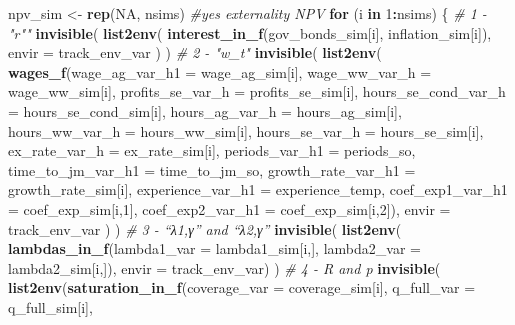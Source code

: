 \documentclass[]{article}
\newenvironment{Shaded}{\begin{snugshade}}{\end{snugshade}}
\newcommand{\CommentTok}[1]{\textcolor[rgb]{0.56,0.35,0.01}{\textit{#1}}}
\newcommand{\ControlFlowTok}[1]{\textcolor[rgb]{0.13,0.29,0.53}{\textbf{#1}}}
\newcommand{\DataTypeTok}[1]{\textcolor[rgb]{0.13,0.29,0.53}{#1}}
\newcommand{\DecValTok}[1]{\textcolor[rgb]{0.00,0.00,0.81}{#1}}
\newcommand{\KeywordTok}[1]{\textcolor[rgb]{0.13,0.29,0.53}{\textbf{#1}}}
\newcommand{\NormalTok}[1]{#1}
\newcommand{\OperatorTok}[1]{\textcolor[rgb]{0.81,0.36,0.00}{\textbf{#1}}}
\newcommand{\OtherTok}[1]{\textcolor[rgb]{0.56,0.35,0.01}{#1}}
\newcommand{\StringTok}[1]{\textcolor[rgb]{0.31,0.60,0.02}{#1}}
\begin{document}
\begin{Shaded}
\begin{Highlighting}[]
\NormalTok{      npv_sim <-}\StringTok{ }\KeywordTok{rep}\NormalTok{(}\OtherTok{NA}\NormalTok{, nsims)}
      \CommentTok{#yes externality NPV}
      \ControlFlowTok{for}\NormalTok{ (i }\ControlFlowTok{in} \DecValTok{1}\OperatorTok{:}\NormalTok{nsims) \{}
          \CommentTok{# 1 - "r""}
          \KeywordTok{invisible}\NormalTok{( }\KeywordTok{list2env}\NormalTok{( }\KeywordTok{interest_in_f}\NormalTok{(gov_bonds_sim[i], inflation_sim[i]), }\DataTypeTok{envir =}\NormalTok{ track_env_var ) )}
          \CommentTok{# 2 - "w_t"}
          \KeywordTok{invisible}\NormalTok{( }\KeywordTok{list2env}\NormalTok{( }\KeywordTok{wages_f}\NormalTok{(}\DataTypeTok{wage_ag_var_h1 =}\NormalTok{ wage_ag_sim[i],}
                                 \DataTypeTok{wage_ww_var_h =}\NormalTok{ wage_ww_sim[i],}
                                 \DataTypeTok{profits_se_var_h =}\NormalTok{ profits_se_sim[i],}
                                 \DataTypeTok{hours_se_cond_var_h =}\NormalTok{ hours_se_cond_sim[i],}
                                 \DataTypeTok{hours_ag_var_h =}\NormalTok{ hours_ag_sim[i],}
                                 \DataTypeTok{hours_ww_var_h =}\NormalTok{ hours_ww_sim[i],}
                                 \DataTypeTok{hours_se_var_h =}\NormalTok{ hours_se_sim[i],}
                                 \DataTypeTok{ex_rate_var_h =}\NormalTok{ ex_rate_sim[i], }
                                 \DataTypeTok{periods_var_h1 =}\NormalTok{ periods_so,}
                                 \DataTypeTok{time_to_jm_var_h1 =}\NormalTok{ time_to_jm_so, }
                                 \DataTypeTok{growth_rate_var_h1 =}\NormalTok{ growth_rate_sim[i],}
                                 \DataTypeTok{experience_var_h1 =}\NormalTok{ experience_temp,}
                                 \DataTypeTok{coef_exp1_var_h1 =}\NormalTok{ coef_exp_sim[i,}\DecValTok{1}\NormalTok{],}
                                 \DataTypeTok{coef_exp2_var_h1 =}\NormalTok{ coef_exp_sim[i,}\DecValTok{2}\NormalTok{]), }\DataTypeTok{envir =}\NormalTok{ track_env_var ) )}
          \CommentTok{# 3 - “λ1,γ” and “λ2,γ”}
          \KeywordTok{invisible}\NormalTok{( }\KeywordTok{list2env}\NormalTok{( }\KeywordTok{lambdas_in_f}\NormalTok{(}\DataTypeTok{lambda1_var =}\NormalTok{ lambda1_sim[i,], }\DataTypeTok{lambda2_var =}\NormalTok{ lambda2_sim[i,]), }\DataTypeTok{envir =}\NormalTok{ track_env_var) ) }
          \CommentTok{# 4 - R and p}
          \KeywordTok{invisible}\NormalTok{( }\KeywordTok{list2env}\NormalTok{(}\KeywordTok{saturation_in_f}\NormalTok{(}\DataTypeTok{coverage_var =}\NormalTok{ coverage_sim[i], }\DataTypeTok{q_full_var =}\NormalTok{ q_full_sim[i], }

\end{Highlighting}
\end{Shaded}
\end{document}
